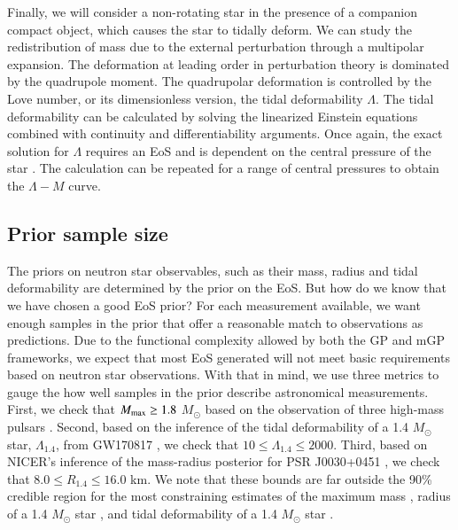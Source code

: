 \documentclass[aps,prd,nofootinbib,tightenlines,notitlepage,floatfix,superscriptaddress,showkeys,twocolumn]{revtex4-1}
\begin{document}
Finally, we will consider a non-rotating star in the presence of a companion compact object, which causes the star to tidally deform. We can study the redistribution of mass due to the external perturbation through a multipolar expansion. 
The deformation at leading order in perturbation theory is dominated by the quadrupole moment. The quadrupolar deformation is controlled by the Love number, or its dimensionless version, the tidal deformability $\Lambda$. The tidal deformability can be calculated by solving the linearized Einstein equations combined with continuity and differentiability arguments. Once again, the exact solution for $\Lambda$ requires an EoS and is dependent on the central pressure of the star \cite{Hinderer:2007mb}. The calculation can be repeated for a range of central pressures to obtain the $\Lambda-M$ curve.  


\subsection{Prior sample size}\label{subsec:hyperprior}

The priors on neutron star observables, such as their mass, radius and tidal deformability are determined by the prior on the EoS. But how do we know that we have chosen a good EoS prior? 
For each measurement available, we want enough samples in the prior that offer a reasonable match to observations as predictions. Due to the functional complexity allowed by both the GP and mGP frameworks, we expect that most EoS generated will not meet basic requirements based on neutron star observations. With that in mind, we use three metrics to gauge the how well samples in the prior describe astronomical measurements. First, we check that $M_{\rm max} \geq 1.8$ $M_\odot$ based on the observation of three high-mass pulsars \cite{arzoumanian2018nanograv, antoniadis2013massive,cromartie2020relativistic}. Second, based on the inference of the tidal deformability of a 1.4 $M_\odot$ star, $\Lambda_{1.4}$, from GW170817 \cite{de2018tidal}, we check that $ 10 \leq \Lambda_{1.4} \leq 2000$. Third, based on NICER's inference of the mass-radius posterior for PSR J0030+0451 \cite{Miller:2019cac,Riley:2019yda}, we check that $ 8.0 \leq R_{1.4} \leq 16.0$ km. We note that these bounds are far outside the 90\% credible region for the most constraining estimates of the maximum mass \cite{NANOGrav:2023hde}, radius of a 1.4 $M_\odot$ star \cite{Miller:2021qha}, and tidal deformability of a 1.4 $M_\odot$ star \cite{de2018tidal}. 
\end{document}
